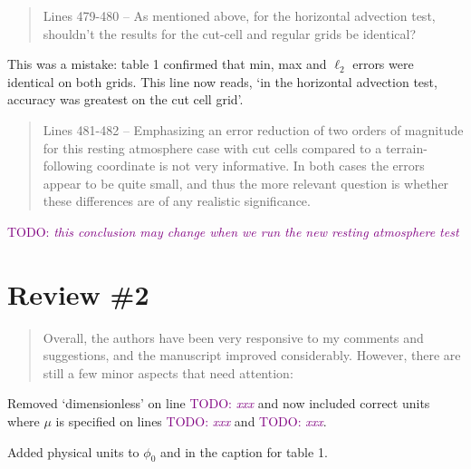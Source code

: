 \documentclass{article}
\newcommand{\TODO}[1]{\textcolor{purple}{TODO: \emph{#1}}}
\begin{document}
\begin{quotation}
 Lines 479-480 – As mentioned above, for the horizontal advection test, shouldn't the  results for the cut-cell and regular grids be identical?
\end{quotation}
This was a mistake: table 1 confirmed that min, max and $\ell_2$ errors were identical on both grids.  This line now reads, `in the horizontal advection test, accuracy was greatest on the cut cell grid'.

\begin{quotation}
 Lines 481-482 – Emphasizing an error reduction of two orders of magnitude for this 
 resting atmosphere case with cut cells compared to a terrain-following coordinate is 
 not very informative. In both cases the errors appear to be quite small, and thus the 
 more relevant question is whether these differences are of any realistic significance. 
\end{quotation}
\TODO{this conclusion may change when we run the new resting atmosphere test}


\section*{Review \#2}
\begin{quotation}
Overall, the authors have been very responsive to my comments and suggestions, and the manuscript improved considerably.
However, there are still a few minor aspects that need attention:
\begin{comment}
\item From equation (7a) it is clear that the symbol mu needs a physical unit which is 1/s. The statement in line 195
that mu is dimensionless is therefore wrong and needs to be corrected.
\end{comment}
\end{quotation}
Removed `dimensionless' on line \TODO{xxx} and now included correct units where $\mu$ is specified on lines \TODO{xxx} and \TODO{xxx}.

\begin{quotation}
	\begin{comment}
	\item Line 241: $\phi$ is defined as the tracer density. Therefore, the definition of $\phi_0$ needs the physical unit \si{\kilogram\per\meter\cubed}
	\end{comment}
\end{quotation}
Added physical units to $\phi_0$ and in the caption for table 1.
\end{document}
